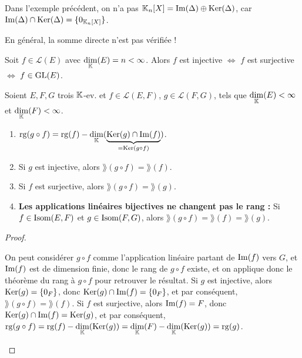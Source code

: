 \documentclass[12pt, a4paper]{report}
\begin{document}
\begin{attention}
    Dans l'exemple précédent, on n'a pas $\mathbb{K}_n[X] = \mathrm{Im}(\Delta) \oplus \mathrm{Ker}(\Delta)$, car $\mathrm{Im}(\Delta) \cap \mathrm{Ker}(\Delta) = \{0_{\mathbb{K}_n[X]}\}$.

    En général, la somme directe n'est pas vérifiée !
\end{attention}

\begin{consequence}
    Soit $f \in \mathcal L(E)$ avec $\underset{\mathbb{K}}\dim(E) = n < \infty$. Alors $f$ est injective $\iff$ $f$ est surjective $\iff$ $f \in \mathrm{GL}(E)$.
\end{consequence}

\begin{property}
    Soient $E, F, G$ trois $\mathbb{K}$-ev. et $f \in \mathcal L(E,F)$, $g \in \mathcal L(F,G)$, tels que $\underset{\mathbb{K}}\dim(E) < \infty$ et $\underset{\mathbb{K}}\dim(F) < \infty$.

    \begin{enumerate}
        \item $\mathrm{rg}(g\circ f) = \mathrm{rg}(f) - \underset{\mathbb{K}}\dim(\underbrace{\mathrm{Ker}(g) \cap \mathrm{Im}(f)}_{=\mathrm{Ker}(g\circ f)})$.
        \item Si $g$ est injective, alors $\rang(g\circ f) = \rang(f)$.
        \item Si $f$ est surjective, alors $\rang(g\circ f) = \rang(g)$.
        \item \textbf{Les applications linéaires bijectives ne changent pas le rang :} Si $f \in \mathrm{Isom}(E,F)$ et $g \in \mathrm{Isom}(F,G)$, alors $\rang(g\circ f) = \rang(f) = \rang(g)$.
    \end{enumerate}
\end{property}

\begin{proof}
    \begin{outline}[enumerate]
    \1 On peut considérer $g\circ f$ comme l'application linéaire partant de $\mathrm{Im}(f)$ vers $G$, et $\mathrm{Im}(f)$ est de dimension finie, donc le rang de $g\circ f$ existe, et on applique donc le théorème du rang à $g\circ f$ pour retrouver le résultat.
    \1 Si $g$ est injective, alors $\mathrm{Ker}(g) = \{0_F\}$, donc $\mathrm{Ker}(g) \cap \mathrm{Im}(f) = \{0_F\}$, et par conséquent, $\rang(g\circ f) = \rang(f)$.
    \1 Si $f$ est surjective, alors $\mathrm{Im}(f) = F$, donc $\mathrm{Ker}(g) \cap \mathrm{Im}(f) = \mathrm{Ker}(g)$, et par conséquent, $\mathrm{rg}(g\circ f) = \mathrm{rg}(f) - \underset{\mathbb{K}}\dim(\mathrm{Ker}(g)) = \underset{\mathbb{K}}\dim(F) - \underset{\mathbb{K}}\dim(\mathrm{Ker}(g)) = \mathrm{rg}(g)$.
    \end{outline}
\end{proof}
\end{document}
